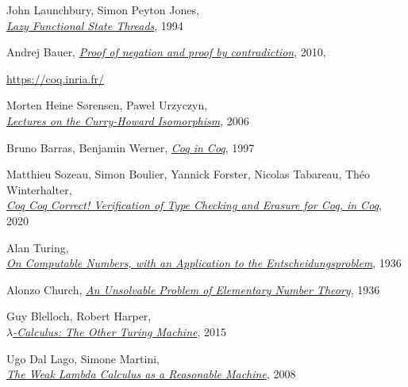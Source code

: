 \documentclass[declaration,mgr,english,shortabstract]{iithesis}
\begin{document}
\begin{thebibliography}{1}
    John Launchbury, Simon Peyton Jones, \\
    \href{https://www.microsoft.com/en-us/research/wp-content/uploads/1994/06/lazy-functional-state-threads.pdf}{\textit{Lazy Functional State Threads}}, 1994

    Andrej Bauer,
    \href{http://math.andrej.com/2010/03/29/proof-of-negation-and-proof-by-contradiction/}{\textit{Proof of negation and proof by contradiction}}, 2010, \\

    \url{https://coq.inria.fr/}

    Morten Heine Sørensen, Paweł Urzyczyn, \\
    \href{http://disi.unitn.it/~bernardi/RSISE11/Papers/curry-howard.pdf}{\textit{Lectures on the Curry-Howard Isomorphism}}, 2006

    Bruno Barras, Benjamin Werner,
    \href{http://www.lix.polytechnique.fr/Labo/Bruno.Barras/publi/coqincoq.pdf}{\textit{Coq in Coq}}, 1997

    Matthieu Sozeau, Simon Boulier, Yannick Forster, Nicolas Tabareau, Théo Winterhalter, \\
    \href{https://www.irif.fr/~sozeau/research/publications/drafts/Coq_Coq_Correct.pdf}{\textit{Coq Coq Correct! Verification of Type Checking and Erasure for Coq, in Coq}}, 2020

    Alan Turing, \\
    \href{https://www.cs.virginia.edu/~robins/Turing_Paper_1936.pdf}{\textit{On Computable Numbers, with an Application to the Entscheidungsproblem}}, 1936

    Alonzo Church,
    \href{https://www.ics.uci.edu/~lopes/teaching/inf212W12/readings/church.pdf}{\textit{An Unsolvable Problem of Elementary Number Theory}}, 1936

    Guy Blelloch, Robert Harper, \\
    \href{https://www.cs.cmu.edu/~rwh/papers/lctotm/cs50.pdf}{\textit{$\lambda$-Calculus: The Other Turing Machine}}, 2015

    Ugo Dal Lago, Simone Martini, \\
    \href{https://www.di.unito.it/~deligu/CDR60_TCS/Martini.pdf}{\textit{The Weak Lambda Calculus as a Reasonable Machine}}, 2008


\end{thebibliography}
\end{document}
